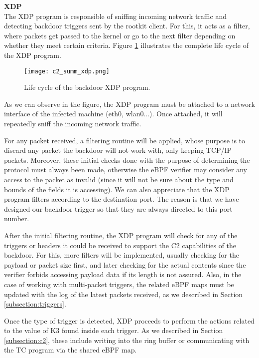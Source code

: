 \textbf{XDP}\\
The XDP program is responsible of sniffing incoming network traffic and detecting backdoor triggers sent by the rootkit client. For this, it acts as a filter, where packets get passed to the kernel or go to the next filter depending on whether they meet certain criteria. Figure \ref{fig:c2_summ_xdp} illustrates the complete life cycle of the XDP program.

\begin{figure}[htbp]
	\centering
	\texttt{[image: c2\_summ\_xdp.png]}
	\caption{Life cycle of the backdoor XDP program.}
	\label{fig:c2_summ_xdp}
\end{figure}

As we can observe in the figure, the XDP program must be attached to a network interface of the infected machine (eth0, wlan0...). Once attached, it will repeatedly sniff the incoming network traffic.

For any packet received, a filtering routine will be applied, whose purpose is to discard any packet the backdoor will not work with, only keeping TCP/IP packets. Moreover, these initial checks done with the purpose of determining the protocol must always been made, otherwise the eBPF verifier may consider any access to the packet as invalid (since it will not be sure about the type and bounds of the fields it is accessing). We can also appreciate that the XDP program filters according to the destination port. The reason is that we have designed our backdoor trigger so that they are always directed to this port number.

After the initial filtering routine, the XDP program will check for any of the triggers or headers it could be received to support the C2 capabilities of the backdoor. For this, more filters will be implemented, usually checking for the payload or packet size first, and later checking for the actual contents since the verifier forbids accessing payload data if its length is not assured. Also, in the case of working with multi-packet triggers, the related eBPF maps must be updated with the log of the latest packets received, as we described in Section \ref{subsection:triggers}.

Once the type of trigger is detected, XDP proceeds to perform the actions related to the value of K3 found inside each trigger. As we described in Section \ref{subsection:c2}, these include writing into the ring buffer or communicating with the TC program via the shared eBPF map.

